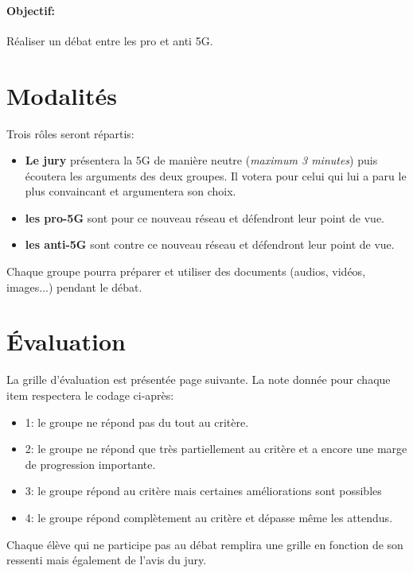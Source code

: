 \documentclass[a4paper,11pt]{article}
\begin{document}
\begin{Form}
\paragraph{Objectif:} Réaliser un débat entre les pro et anti 5G.\\
\section{Modalités}
Trois rôles seront répartis:
\begin{itemize}
\item \textbf{Le jury} présentera la 5G de manière neutre (\emph{maximum 3 minutes}) puis écoutera les arguments des deux groupes. Il votera pour celui qui lui a paru le plus convaincant et argumentera son choix.
\item \textbf{les pro-5G} sont pour ce nouveau réseau et défendront leur point de vue. 
\item \textbf{les anti-5G} sont contre ce nouveau réseau et défendront leur point de vue.
\end{itemize}
Chaque groupe pourra préparer et utiliser des documents (audios, vidéos, images...) pendant le débat.
\section{Évaluation}
La grille d'évaluation est présentée page suivante. La note donnée pour chaque item respectera le codage ci-après:
\begin{itemize}
\item 1: le groupe ne répond pas du tout au critère.
\item 2: le groupe ne répond que très partiellement au critère et a encore une marge de progression importante.
\item 3: le groupe répond au critère mais certaines améliorations sont possibles
\item 4: le groupe répond complètement au critère et dépasse même les attendus.
\end{itemize}
Chaque élève qui ne participe pas au débat remplira une grille en fonction de son ressenti mais également de l'avis du jury.
\renewcommand{\arraystretch}{1.2}

\begin{commentprof}

\end{commentprof}
\end{Form}
\end{document}
